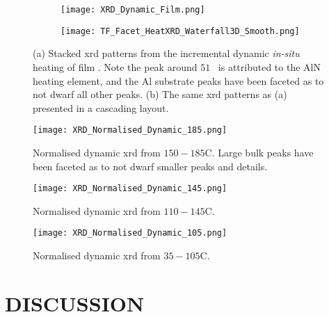 \documentclass[a4paper,12pt,oneside]{article}%
\begin{document}
\begin{figure}[b]
	\centering
	\begin{subfigure}[htbp]{0.75\textwidth}
		\texttt{[image: XRD\_Dynamic\_Film.png]}
		\caption{}
		\label{fig:XRD_Dynamic_FullStack_Film}
	\end{subfigure}
	\begin{subfigure}[htbp]{0.75\textwidth}
		\texttt{[image: TF\_Facet\_HeatXRD\_Waterfall3D\_Smooth.png]}
		\caption{}
		\label{fig:XRD_Dynamic_WaterFall_Film}
	\end{subfigure}
	\caption{(a) Stacked \acrshort{xrd} patterns from the incremental dynamic \textit{in-situ} heating of film \MgZnCa. Note the peak around $51$\degree~ is attributed to the AlN heating element, and the Al substrate peaks have been faceted as to not dwarf all other peaks. (b) The same \acrshort{xrd} patterns as (a) presented in a cascading layout.}%
	\label{fig:XRD_Dynamic_Film}
\end{figure}

\begin{figure}[b]
	\centering
	\texttt{[image: XRD\_Normalised\_Dynamic\_185.png]}
	\caption[Table of contents Capition]{Normalised dynamic \acrshort{xrd} from $150-185$\degree C. Large bulk peaks have been faceted as to not dwarf smaller peaks and details.}%
	\label{fig:XRD_Dynamic_185}
\end{figure}

\begin{figure}[b]
	\centering
	\texttt{[image: XRD\_Normalised\_Dynamic\_145.png]}
	\caption[Table of contents Capition]{Normalised dynamic \acrshort{xrd} from $110-145$\degree C.}%
	\label{fig:XRD_Dynamic_145}
\end{figure}

\begin{figure}[b]
	\centering
	\texttt{[image: XRD\_Normalised\_Dynamic\_105.png]}
	\caption[Table of contents Capition]{Normalised dynamic \acrshort{xrd} from $35-105$\degree C.}%
	\label{fig:XRD_Dynamic_105}
\end{figure}


\section{DISCUSSION}
\end{document}
